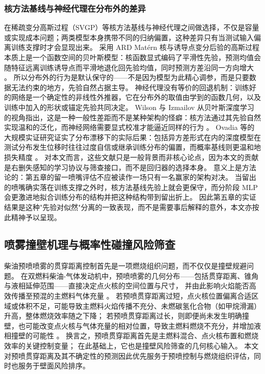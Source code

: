 \subsubsection{核方法基线与神经代理在分布外的差异}
\label{sec:kernel-vs-nn-ood-zh}

在稀疏变分高斯过程（SVGP）等核方法基线与神经代理之间做选择，不仅是容量或实现成本问题；两类模型本身携带不同的归纳偏置，这种差异只有当测试输入偏离训练支撑时才会显现出来。
采用 ARD Mat\'ern 核与诱导点变分后验的高斯过程本质上是一个函数空间的贝叶斯模型：核函数显式编码了平滑性先验，预测均值会随特征远离训练诱导点而平滑地退化回先验均值，同时预测方差沿同一方向增大 \cite{RasmussenWilliams2006,HensmanFusiLawrence2013}。
所以分布外的行为是默认保守的——不是因为模型为此精心调参，而是只要数据无法约束的地方，先验自然占据主导。
神经代理没有等价的回退机制：训练好的网络是一个确定性的非线性外推器，它在分布外的取值由学到的函数几何，以及训练中加入的形状或锚定先验共同决定。
Wilson 与 Izmailov 从贝叶斯深度学习的视角指出，这是一种一般性差距而不是某种架构的怪癖：核方法通过其先验自然实现温和的泛化，而神经网络需要显式校准才能逼近同样的行为 \cite{WilsonIzmailov2020BDL}。
Ovadia 等的大规模实证研究证实了分布漂移下的实际后果：包括异方差形式在内的深度模型在测试分布发生位移时往往过度自信或继承训练分布的偏置，而概率基线则更温和地损失精度 \cite{Ovadia2019Trust}。
对本文而言，这些文献只是一般背景而非核心论点，因为本文的贡献是右删失感知的学习协议与筛查接口，而不是回归器的选择本身。
意义上是方法论的：第五章的留一喷嘴评估不应被读作一场只有一名赢家的架构对决。
当留出的喷嘴确实落在训练支撑之外时，核方法基线先验上就会更保守，而分阶段 MLP 会更激进地拟合训练分布的结构并把这种结构带到留出折上。
因此第五章的实证结果是这种"先验对似然"分离的一致表现，而不是需要事后解释的意外，本文亦按此精神予以呈现。

\subsection{喷雾撞壁机理与概率性碰撞风险筛查}\label{sec:wall-impingement-screening-zh}

柴油预喷喷雾的贯穿距离控制首先是一项燃烧组织问题，而不仅仅是撞壁规避问题。
在双燃料柴油-气体发动机中，预喷喷雾的几何分布——包括贯穿距离、锥角与液相延伸范围——直接决定点火核的空间位置与尺寸，
并由此影响火焰能否高效传播至预混的主燃料气体充量
\cite{Karim2015DualFuel,WeiGeng2016DualFuelReview,Sahoo2009DualFuelReview}。
若预喷贯穿距离过短，点火核位置偏离合适区域或体积不足，可能导致主燃料火焰传播不充分、未燃碳氢化合物（如甲烷滑漏）升高，整体燃烧效率随之下降；
若预喷贯穿距离过长，则即便尚未发生明确撞壁，也可能改变点火核与气体充量的相对位置，导致主燃料燃烧不充分，并增加液相撞壁的可能性
\cite{WeiGeng2016DualFuelReview,Sahoo2009DualFuelReview}。
换言之，预喷贯穿距离首先是主燃料混合、点火核布置和燃烧效率的关键控制变量；
在此基础上，它也是撞壁风险筛查的几何核心输入。
本文对预喷贯穿距离及其不确定性的预测因此优先服务于预喷控制与燃烧组织评估，同时也服务于壁面风险排序。

